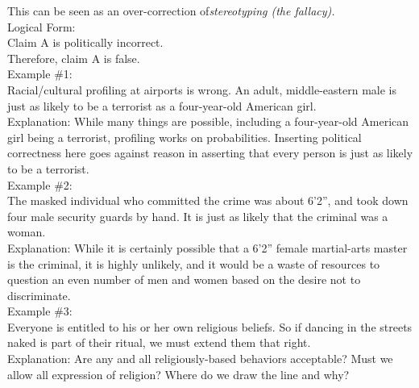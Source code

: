 \documentclass[a4paper,12pt,single,pdftex]{scrartcl}
\begin{document}
    
      This can be seen as an over-correction of{\it  stereotyping (the fallacy). \newline
}
    \\

    
      Logical Form:
    \\

    
      Claim A is politically incorrect.
    \\

    
      Therefore, claim A is false.
    \\

    
      Example \#1:
    \\

    
      Racial/cultural profiling at airports is wrong.  An adult, middle-eastern male is just as likely to be a terrorist as a four-year-old American girl.
    \\

    
      Explanation: While many things are possible, including a four-year-old American girl being a terrorist, profiling works on probabilities. Inserting political correctness here goes against reason in asserting that every person is just as likely to be a terrorist.
    \\

    
      Example \#2:
    \\

    
      The masked individual who committed the crime was about 6’2”, and took down four male security guards by hand.  It is just as likely that the criminal was a woman.
    \\

    
      Explanation: While it is certainly possible that a 6’2” female martial-arts master is the criminal, it is highly unlikely, and it would be a waste of resources to question an even number of men and women based on the desire not to discriminate.
    \\

    
      Example \#3:
    \\

    
      Everyone is entitled to his or her own religious beliefs.  So if dancing in the streets naked is part of their ritual, we must extend them that right.
    \\

    
      Explanation: Are any and all religiously-based behaviors acceptable?  Must we allow all expression of religion?  Where do we draw the line and why?
    \\
\end{document}
